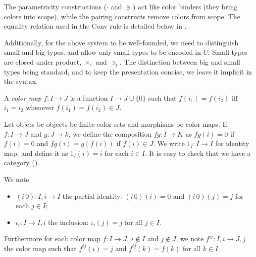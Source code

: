 \documentclass[english]{PaperTools/latex/lipics}
\def\pI{\ensuremath{\mathbf{pI}}}
\begin{document}
The parametricity constructions ($·$ and $∋$) act like color
binders (they bring colors into scope), while the pairing constructs
remove colors from scope.
The equality relation used in the {\sc Conv} rule is detailed below in .

Additionally, for the above system to be well-founded, we need to
distinguish small and big types, and allow only small types to be
encoded in $U$. Small types are closed under product, $×_i$ and
$∋_i$. The distinction between big and small types being standard, and
to keep the presentation concise, we leave it implicit in the syntax.

\begin{definition}
  A \emph{color map} $f : I → J$ is a function $I → J ∪ \{0\}$ such that
  $f(i_1) = f(i_2)$ iff $i_1 = i_2$ whenever $f(i_1) = f(i_2) ∈ J$.
%
%
\end{definition}

\begin{definition}[Category $\pI{}$]
  \label{def:pI}
  Let objets be objects be finite color sets
  and morphisms be color maps.
  If $f : I → J$ and $g : J → k$, we define the composition $fg : I → K$
  as $fg(i) = 0$ if $f(i) = 0$ and $fg(i) = g(f(i))$ if $f(i) ∈ J$.
  We write $1_I : I → I$ for identity map, and define it as $1_I(i) = i$ for each $i ∈ I$.
  It is easy to check that we have a category (\cite[ex.~9.7 p.~176]{PittsAM:nomsns}).
\end{definition}

We note
\begin{itemize}
\item $(i\,0) : I,i → I$ the partial identity: $(i\,0)(i) = 0$ and $(i\,0)(j) = j$ for each $j ∈ I$; 
\item $ι_i : I → I,i$ the inclusion: $ι_i(j) =j$ for all $j ∈ I$.
\end{itemize}
Furthermore for each color map $f : I → J$, $i ∉ I$ and $j ∉ J$, we
note $f^{ij} : I,i → J,j$ the color map such that
$f^{ij}(i) = j$ and $f^{ij}(k) = f(k)$ for all $k ∈ I$.
\end{document}
